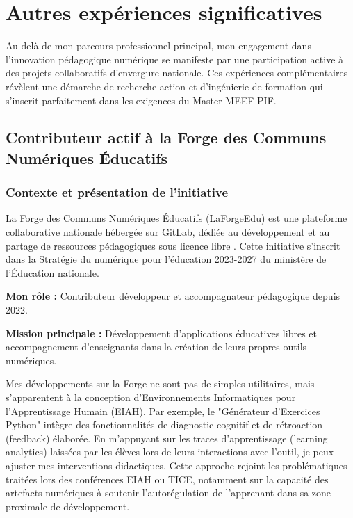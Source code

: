 \chapter{Autres expériences significatives}

Au-delà de mon parcours professionnel principal, mon engagement dans l'innovation pédagogique numérique se manifeste par une participation active à des projets collaboratifs d'envergure nationale. Ces expériences complémentaires révèlent une démarche de recherche-action et d'ingénierie de formation qui s'inscrit parfaitement dans les exigences du Master MEEF PIF.

\section{Contributeur actif à la Forge des Communs Numériques Éducatifs}

\subsection{Contexte et présentation de l'initiative}

La Forge des Communs Numériques Éducatifs (LaForgeEdu) est une plateforme collaborative nationale hébergée sur GitLab, dédiée au développement et au partage de ressources pédagogiques sous licence libre \parencite{forge_educative}. Cette initiative s'inscrit dans la Stratégie du numérique pour l'éducation 2023-2027 du ministère de l'Éducation nationale.

\textbf{Mon rôle :} Contributeur développeur et accompagnateur pédagogique depuis 2022.

\textbf{Mission principale :} Développement d'applications éducatives libres et accompagnement d'enseignants dans la création de leurs propres outils numériques.

Mes développements sur la Forge ne sont pas de simples utilitaires, mais s'apparentent à la conception d'Environnements Informatiques pour l'Apprentissage Humain (EIAH). Par exemple, le "Générateur d'Exercices Python" intègre des fonctionnalités de diagnostic cognitif et de rétroaction (feedback) élaborée. En m'appuyant sur les traces d'apprentissage (learning analytics) laissées par les élèves lors de leurs interactions avec l'outil, je peux ajuster mes interventions didactiques. Cette approche rejoint les problématiques traitées lors des conférences EIAH ou TICE, notamment sur la capacité des artefacts numériques à soutenir l'autorégulation de l'apprenant dans sa zone proximale de développement.

